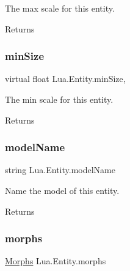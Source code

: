 The max scale for this entity. 

\begin{DoxyReturn}{Returns}

\end{DoxyReturn}
\mbox{\label{class_lua_1_1_entity_a642603e2952e4fcea70979837049f813}} 
\subsubsection{\texorpdfstring{minSize}{minSize}}
{\footnotesize\ttfamily virtual float Lua.\+Entity.\+min\+Size\hspace{0.3cm}{\ttfamily [get]}, {\ttfamily [set]}}



The min scale for this entity. 

\begin{DoxyReturn}{Returns}

\end{DoxyReturn}
\mbox{\label{class_lua_1_1_entity_acd67b39a7c95e3cb87171073c2877de1}} 
\subsubsection{\texorpdfstring{modelName}{modelName}}
{\footnotesize\ttfamily string Lua.\+Entity.\+model\+Name\hspace{0.3cm}{\ttfamily [get]}}



Name the model of this entity. 

\begin{DoxyReturn}{Returns}

\end{DoxyReturn}
\mbox{\label{class_lua_1_1_entity_aa9723210eb2494461ff12c55b52e8844}} 
\subsubsection{\texorpdfstring{morphs}{morphs}}
{\footnotesize\ttfamily \mbox{\hyperlink{class_lua_1_1_morphs}{Morphs}} Lua.\+Entity.\+morphs\hspace{0.3cm}{\ttfamily [get]}}



